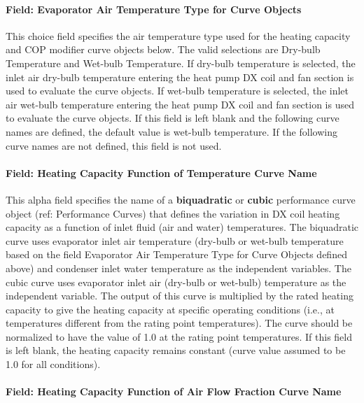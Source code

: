 \paragraph{Field: Evaporator Air Temperature Type for Curve Objects}\label{field-evaporator-air-temperature-type-for-curve-objects-1}

This choice field specifies the air temperature type used for the heating capacity and COP modifier curve objects below. The valid selections are Dry-bulb Temperature and Wet-bulb Temperature. If dry-bulb temperature is selected, the inlet air dry-bulb temperature entering the heat pump DX coil and fan section is used to evaluate the curve objects. If wet-bulb temperature is selected, the inlet air wet-bulb temperature entering the heat pump DX coil and fan section is used to evaluate the curve objects. If this field is left blank and the following curve names are defined, the default value is wet-bulb temperature. If the following curve names are not defined, this field is not used.

\paragraph{Field: Heating Capacity Function of Temperature Curve Name}\label{field-heating-capacity-function-of-temperature-curve-name-2}

This alpha field specifies the name of a \textbf{biquadratic} or \textbf{cubic} performance curve object (ref: Performance Curves) that defines the variation in DX coil heating capacity as a function of inlet fluid (air and water) temperatures. The biquadratic curve uses evaporator inlet air temperature (dry-bulb or wet-bulb temperature based on the field Evaporator Air Temperature Type for Curve Objects defined above) and condenser inlet water temperature as the independent variables. The cubic curve uses evaporator inlet air (dry-bulb or wet-bulb) temperature as the independent variable. The output of this curve is multiplied by the rated heating capacity to give the heating capacity at specific operating conditions (i.e., at temperatures different from the rating point temperatures). The curve should be normalized to have the value of 1.0 at the rating point temperatures. If this field is left blank, the heating capacity remains constant (curve value assumed to be 1.0 for all conditions).

\paragraph{Field: Heating Capacity Function of Air Flow Fraction Curve Name}\label{field-heating-capacity-function-of-air-flow-fraction-curve-name-1}

